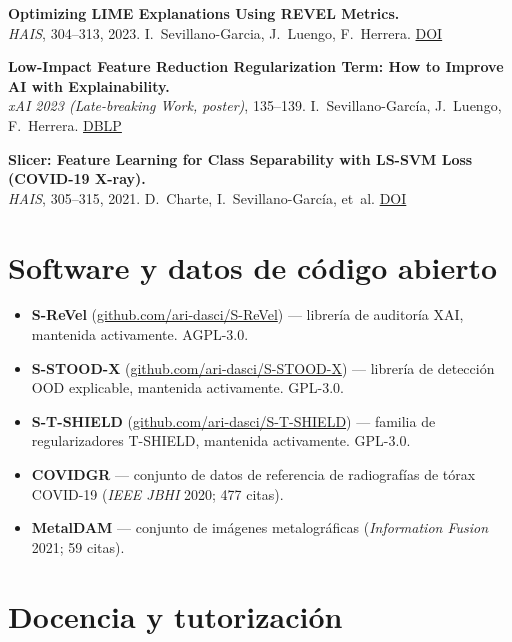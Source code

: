 \documentclass[10pt,a4paper]{article}
\newcommand{\sub}[1]{\textcolor{subtle}{\footnotesize #1}}
\begin{document}
\textbf{Optimizing LIME Explanations Using REVEL Metrics.} \\
\sub{\textit{HAIS}, 304--313, 2023. I.~Sevillano-Garcia, J.~Luengo, F.~Herrera. \href{https://doi.org/10.1007/978-3-031-40725-3_26}{DOI}}

\textbf{Low-Impact Feature Reduction Regularization Term: How to Improve AI with Explainability.} \\
\sub{\textit{xAI 2023 (Late-breaking Work, poster)}, 135--139. I.~Sevillano-García, J.~Luengo, F.~Herrera. \href{https://dblp.org/rec/conf/xai/Sevillano-Garcia23}{DBLP}}

\textbf{Slicer: Feature Learning for Class Separability with LS-SVM Loss (COVID-19 X-ray).} \\
\sub{\textit{HAIS}, 305--315, 2021. D.~Charte, I.~Sevillano-García, et~al. \href{https://doi.org/10.1007/978-3-030-86271-8_26}{DOI}}

\normalsize

\section*{Software y datos de código abierto}

\begin{itemize}
    \item \textbf{S-ReVel} (\href{https://github.com/ari-dasci/S-ReVel}{github.com/ari-dasci/S-ReVel}) --- librería de auditoría XAI, mantenida activamente. AGPL-3.0.
    \item \textbf{S-STOOD-X} (\href{https://github.com/ari-dasci/S-STOOD-X}{github.com/ari-dasci/S-STOOD-X}) --- librería de detección OOD explicable, mantenida activamente. GPL-3.0.
    \item \textbf{S-T-SHIELD} (\href{https://github.com/ari-dasci/S-T-SHIELD}{github.com/ari-dasci/S-T-SHIELD}) --- familia de regularizadores T-SHIELD, mantenida activamente. GPL-3.0.
    \item \textbf{COVIDGR} --- conjunto de datos de referencia de radiografías de tórax COVID-19 (\textit{IEEE JBHI} 2020; 477 citas).
    \item \textbf{MetalDAM} --- conjunto de imágenes metalográficas (\textit{Information Fusion} 2021; 59 citas).
\end{itemize}

\section*{Docencia y tutorización}
\end{document}
